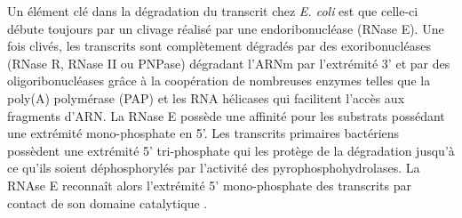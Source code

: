 \documentclass[12pt,a4paper]{report}
\begin{document}
\begin{onehalfspace}
Un élément clé dans la dégradation du transcrit chez \textit{E. coli} est que celle-ci débute toujours par un clivage réalisé par une endoribonucléase (RNase E). Une fois clivés, les transcrits sont complètement dégradés par des exoribonucléases (RNase R, RNase II ou PNPase) dégradant l'ARNm par l'extrémité 3' et par des oligoribonucléases grâce à la coopération de nombreuses enzymes telles que la poly(A) polymérase (PAP) et les RNA hélicases qui facilitent l'accès aux fragments d'ARN. La RNase E possède une affinité pour les substrats possédant une extrémité mono-phosphate en 5'. Les transcrits primaires bactériens possèdent une extrémité 5' tri-phosphate qui les protège de la dégradation jusqu'à ce qu'ils soient déphosphorylés par l'activité des pyrophosphohydrolases. La RNAse E reconnaît alors l'extrémité 5' mono-phosphate des transcrits par contact de son domaine catalytique \citep{Callaghan2005,Bandyra2013}.

\begin{figure}
\end{figure}


\end{onehalfspace}
\end{document}
